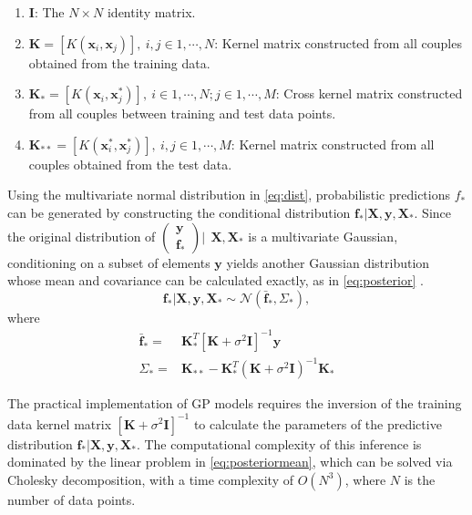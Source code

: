 \begin{enumerate}
      \item $\mathbf{I}$: The $N \times N$ identity matrix.
      \item $\mathbf{K} = [K(\mathbf{x}_i, \mathbf{x}_j)], \ i,j \in 1,\cdots,N$: 
            Kernel matrix constructed from all couples obtained from the training data.
      \item $\mathbf{K}_{*} = [K(\mathbf{x}_i, \mathbf{x}^{*}_j)], \ i \in 1,\cdots,N ; j \in 1,\cdots,M$: 
            Cross kernel matrix constructed from all couples between training and test data points.
      \item $\mathbf{K}_{**} = [K(\mathbf{x}^{*}_i, \mathbf{x}^{*}_j)], \ i,j \in 1,\cdots,M$: 
            Kernel matrix constructed from all couples obtained from the test data.
\end{enumerate}

Using the multivariate normal distribution in \cref{eq:dist}, probabilistic predictions 
$f_*$ can be generated by constructing the conditional distribution 
$\mathbf{f_*}|\mathbf{X},\mathbf{y},\mathbf{X_*}$. Since the original distribution of 
$\left( \begin{array}{c} \mathbf{y} \\ \mathbf{f_*} \end{array} \right) | \ \ \mathbf{X}, \mathbf{X}_*$ 
is a multivariate Gaussian, conditioning on a subset of elements $\mathbf{y}$ yields another 
Gaussian distribution whose mean and covariance can be calculated exactly, as in 
\cref{eq:posterior} \citep{Rasmussen:2005:GPM:1162254}.
%
\begin{equation}
    \mathbf{f_*}|\mathbf{X},\mathbf{y},\mathbf{X_*} \sim \mathcal{N}(\mathbf{\bar{f}_*}, \Sigma_*)  \label{eq:posterior},
\end{equation}
where
\begin{align}
    \mathbf{\bar{f}_*} = & \mathbf{K}^T_{*} [\mathbf{K} + \sigma^{2} \mathbf{I}]^{-1} \mathbf{y} \label{eq:posteriormean} \\
    \Sigma_* = & \mathbf{K}_{**} - \mathbf{K}^T_{*} \left(\mathbf{K} + \sigma^{2} \mathbf{I}\right)^{-1} \mathbf{K}_{*} \label{eq:posteriorcov}
\end{align}

The practical implementation of GP models requires the inversion of the training data kernel 
matrix $[\mathbf{K} + \sigma^{2} \mathbf{I}]^{-1}$ to calculate the parameters 
of the predictive distribution $\mathbf{f_*}|\mathbf{X},\mathbf{y},\mathbf{X_*}$. The computational 
complexity of this inference is dominated by the linear problem in \cref{eq:posteriormean}, which 
can be solved via Cholesky decomposition, with a time complexity of $O(N^3)$, where $N$ is the 
number of data points.

